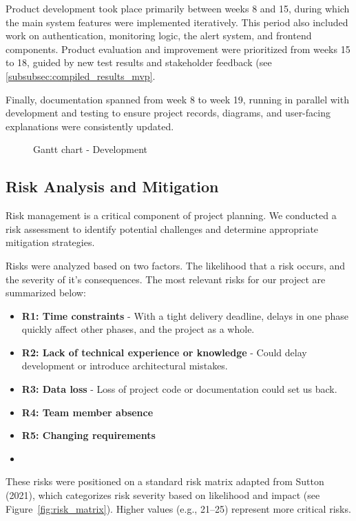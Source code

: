 Product development took place primarily between weeks 8 and 15, during which the main system features were implemented iteratively. This period also included work on authentication, monitoring logic, the alert system, and frontend components. Product evaluation and improvement were prioritized from weeks 15 to 18, guided by new test results and stakeholder feedback (see \ref{subsubsec:compiled_results_mvp}.

Finally, documentation spanned from week 8 to week 19, running in parallel with development and testing to ensure project records, diagrams, and user-facing explanations were consistently updated.

\begin{figure}[H]
    \centering
    \caption{Gantt chart - Development}
    \label{sfig:gantt_dev}
\end{figure}

\subsection{Risk Analysis and Mitigation}

Risk management is a critical component of project planning. We conducted a risk assessment to identify potential challenges and determine appropriate mitigation strategies.

Risks were analyzed based on two factors. The likelihood that a risk occurs, and the severity of it's consequences.  The most relevant risks for our project are summarized below:

\begin{itemize}

    \item \textbf{R1: Time constraints} - With a tight delivery deadline, delays in one phase quickly affect other phases, and the project as a whole.
    \item \textbf{R2: Lack of technical experience or knowledge} - Could delay development or introduce architectural mistakes.
    \item \textbf{R3: Data loss} - Loss of project code or documentation could set us back.
    \item \textbf{R4: Team member absence}
    \item \textbf{R5: Changing requirements}
    \item \end{itemize}

These risks were positioned on a standard risk matrix adapted from Sutton (2021), which categorizes risk severity based on likelihood and impact (see Figure~\ref{fig:risk_matrix}). Higher values (e.g., 21–25) represent more critical risks.

